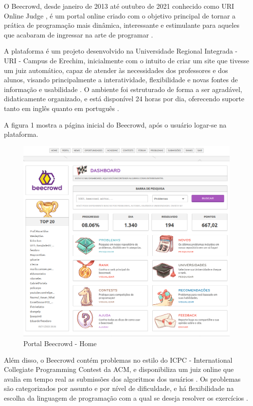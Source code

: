 O Beecrowd, desde janeiro de 2013 até outubro de 2021 conhecido como URI Online Judge \cite[p.~5]{piekarski}, é um portal online criado com o objetivo principal de tornar a prática de programação mais dinâmica, interessante e estimulante para aqueles que acabaram de ingressar na arte de programar \cite[p.~1]{beztonin2012}.

A plataforma é um projeto desenvolvido na Universidade Regional Integrada - URI - Campus de Erechim, inicialmente com o intuito de criar um site que tivesse um juiz automático, capaz de atender às necessidades dos professores e dos alunos, visando principalmente a interatividade, flexibilidade e novas fontes de informação e usabilidade \cite[p.~1]{beztonin2012}. O ambiente foi estruturado de forma a ser agradável, didaticamente organizado, e está disponível 24 horas por dia, oferecendo suporte tanto em inglês quanto em português \cite[p.239]{beztonin2014}. 

A figura 1 mostra a página inicial do Beecrowd, após o usuário logar-se na plataforma.


\begin{figure}[h!]
	   \centering
            \caption{Portal Beecrowd - Home}
            \label{fig:BeecrowdHome}
	   	\includegraphics[scale=0.3]{pictures/beecrowd_home.png}
\end{figure}

Além disso, o Beecrowd contém problemas no estilo do ICPC - International Collegiate Programming Contest da ACM, e disponibiliza um juiz online que avalia em tempo real as submissões dos algoritmos dos usuários \cite[p.~350]{berssanettefrancisco}. Os problemas são categorizados por assunto e por nível de dificuldade, e há flexibilidade na escolha da linguagem de programação com a qual se deseja resolver os exercícios \cite[p.~1]{beztonin2012}.

